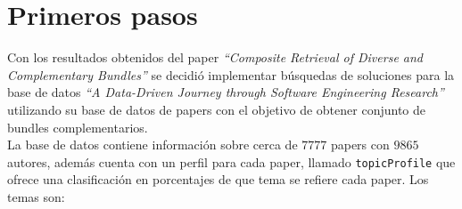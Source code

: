 \section{Primeros pasos}
Con los resultados obtenidos del paper \textit{\textquotedblleft Composite Retrieval of Diverse 
and Complementary Bundles\textquotedblright}\cite{compositeRetrival} se decidió implementar 
búsquedas de soluciones para la base de datos \textit{\textquotedblleft A Data-Driven Journey 
through Software Engineering Research\textquotedblright}\cite{dataDrive} utilizando su base de 
datos de papers con el objetivo de obtener conjunto de bundles complementarios.\\
La base de datos contiene información sobre cerca de $7777$ papers con $9865$ autores, además cuenta 
con un perfil para cada paper, llamado \texttt{topicProfile} que ofrece una clasificación en 
porcentajes de que tema se refiere cada paper. Los temas son:
